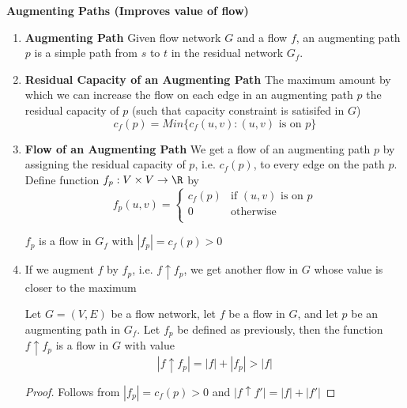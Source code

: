 \documentclass[11pt]{article}
\begin{document}
\begin{defn*}
    \textbf{Augmenting Paths (Improves value of flow)}
    \begin{enumerate}
        \item \textbf{Augmenting Path} Given flow network $G$ and a flow $f$, an augmenting path $p$ is a simple path from $s$ to $t$ in the residual network $G_f$. 
        \item \textbf{Residual Capacity of an Augmenting Path} The maximum amount by which we can increase the flow on each edge in an augmenting path $p$ the residual capacity of $p$ (such that capacity constraint is satisifed in $G$)
        \[
            c_f(p) = Min\{c_f(u,v): (u,v) \text{ is on } p \}
        \]
        \item \textbf{Flow of an Augmenting Path} We get a flow of an augmenting path $p$ by assigning the residual capacity of $p$, i.e. $c_f(p)$, to every edge on the path $p$.  Define function $f_p: V\times V \to \R$ by 
        \[
            f_p(u,v) = 
            \begin{cases}
                c_f(p) & \text{if $(u,v)$ is on $p$}    \\
                0 & \text{otherwise}                    \\
            \end{cases}
        \]
        \begin{lemma*}
            $f_p$ is a flow in $G_f$ with $|f_p| = c_f(p) > 0$
        \end{lemma*}
        \item If we augment $f$ by $f_p$, i.e. $f\uparrow f_p$, we get another flow in $G$ whose value is closer to the maximum 

        \begin{corollary*}
            Let $G = (V, E)$ be a flow network, let $f$ be a flow in $G$, and let $p$ be an augmenting path in $G_f$. Let $f_p$ be defined as previously, then the function $f\uparrow f_p$ is a flow in $G$ with value 
            \[
                |f \uparrow f_p | = |f| + |f_p| > |f|
            \]
            \begin{proof}
                Follows from $|f_p| = c_f(p) > 0$ and $|f \uparrow f'| = |f| + |f'|$
            \end{proof}
        \end{corollary*}
    \end{enumerate}
\end{defn*}
\end{document}
